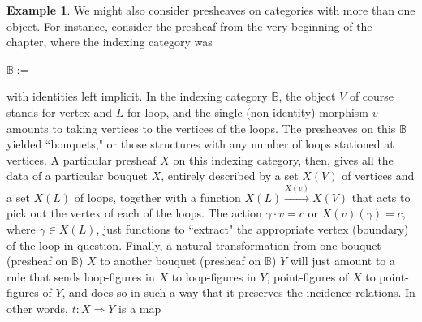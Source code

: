 \documentclass[11pt]{book}
\theoremstyle{definition}
\newtheorem{example}{Example}[section]
\theoremstyle{definition}
\theoremstyle{definition}
\theoremstyle{theorem}
\theoremstyle{definition}
\begin{document}
		\begin{example}
			We might also consider presheaves on categories with more than one object. For instance, consider the presheaf from the very beginning of the chapter, where the indexing category was 
				\begin{center} 
				$\mathbb{B} :=$ 
			\end{center} 
		with identities left implicit. In the indexing category $\mathbb{B}$, the object $V$ of course stands for vertex and $L$ for loop, and the single (non-identity) morphism $v$ amounts to taking vertices to the vertices of the loops. The presheaves on this $\mathbb{B}$ yielded ``bouquets," or those structures with any number of loops stationed at vertices.  A particular presheaf $X$ on this indexing category, then, gives all the data of a particular bouquet $X$, entirely described by a set $X(V)$ of vertices and a set $X(L)$ of loops, together with a function $X(L) \xrightarrow{X(v)} X(V)$ that acts to pick out the vertex of each of the loops. The action $\gamma \cdot v = c$ or $X(v)(\gamma) = c$, where $\gamma \in X(L)$, just functions to ``extract" the appropriate vertex (boundary) of the loop in question. Finally, a natural transformation from one bouquet (presheaf on $\mathbb{B}$) $X$ to another bouquet (presheaf on $\mathbb{B}$) $Y$ will just amount to a rule that sends loop-figures in $X$ to loop-figures in $Y$, point-figures of $X$ to point-figures of $Y$, and does so in such a way that it preserves the incidence relations. In other words, $t: X \Rightarrow Y$ is a map 
			\begin{center}
\end{center}
\end{example}
\end{document}
